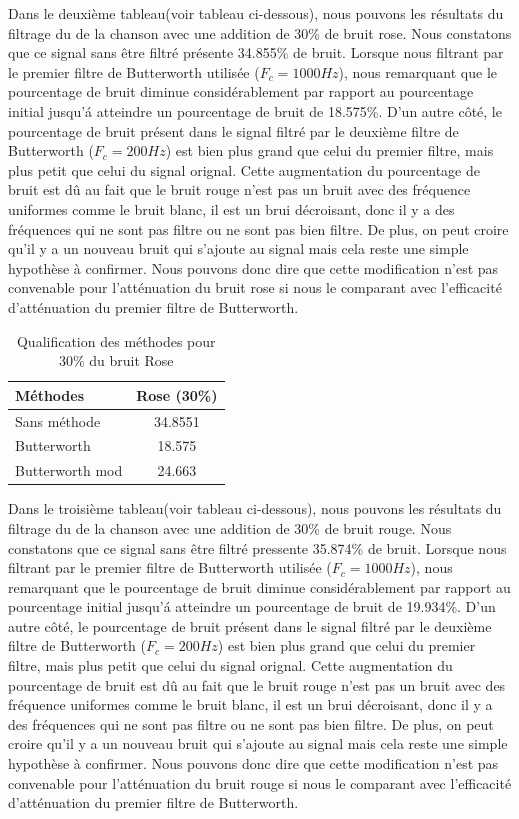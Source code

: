 \documentclass[conference,onecolumn]{IEEEtran}
\begin{document}
Dans le deuxième tableau(voir tableau ci-dessous), nous pouvons les résultats du filtrage du de la chanson avec une addition de 30\% de bruit rose. Nous constatons que ce signal sans être filtré présente 34.855\% de bruit. Lorsque nous filtrant par le premier filtre de Butterworth utilisée ($F_c = 1000 Hz$), nous remarquant que le pourcentage de bruit diminue considérablement par rapport au pourcentage initial jusqu'á atteindre un pourcentage de bruit de 18.575\%. D'un autre côté, le pourcentage de bruit présent dans le signal filtré par le deuxième filtre de Butterworth ($F_c = 200Hz$) est bien plus grand que celui du premier filtre, mais plus petit que celui du signal orignal. Cette augmentation du pourcentage de bruit est dû au fait que le bruit rouge n'est pas un bruit avec des fréquence uniformes comme le bruit blanc, il est un brui décroisant, donc il y a des fréquences qui ne sont pas filtre ou ne sont pas bien filtre. De plus, on peut croire qu'il y a un nouveau bruit qui s'ajoute au signal mais cela reste une simple hypothèse à confirmer. Nous pouvons donc dire que cette modification n'est pas convenable pour l'atténuation du bruit rose si nous le comparant avec l'efficacité d'atténuation du premier filtre de Butterworth.

\begin{table}[hbt!]
    \centering
    \begin{tabular}{ l  c }
    \textbf{Méthodes} & \textbf{Rose (30\%)} \\
    \hline
    Sans méthode &  34.8551\\
    Butterworth &  18.575\\
    Butterworth mod &  24.663\\
    \end{tabular}
    \caption{Qualification des méthodes pour 30\% du bruit Rose}
    \label{table:t7}
\end{table}

Dans le troisième tableau(voir tableau ci-dessous), nous pouvons les résultats du filtrage du de la chanson avec une addition de 30\% de bruit rouge. Nous constatons que ce signal sans être filtré pressente 35.874\% de bruit. Lorsque nous filtrant par le premier filtre de Butterworth utilisée ($F_c = 1000 Hz$), nous remarquant que le pourcentage de bruit diminue considérablement par rapport au pourcentage initial jusqu'á atteindre un pourcentage de bruit de 19.934\%. D'un autre côté, le pourcentage de bruit présent dans le signal filtré par le deuxième filtre de Butterworth ($F_c = 200 Hz$) est bien plus grand que celui du premier filtre, mais plus petit que celui du signal orignal. Cette augmentation du pourcentage de bruit est dû au fait que le bruit rouge n'est pas un bruit avec des fréquence uniformes comme le bruit blanc, il est un brui décroisant, donc il y a des fréquences qui ne sont pas filtre ou ne sont pas bien filtre. De plus, on peut croire qu'il y a un nouveau bruit qui s'ajoute au signal mais cela reste une simple hypothèse à confirmer. Nous pouvons donc dire que cette modification n'est pas convenable pour l'atténuation du bruit rouge si nous le comparant avec l'efficacité d'atténuation du premier filtre de Butterworth.
\end{document}
